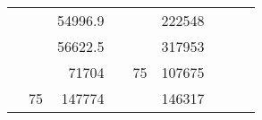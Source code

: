 \begin{table}[H]
\begin{tabular}{|ccrccrccc}
\multicolumn{1}{|c|}{\cellcolor[HTML]{FFFFC7}}                                & \multicolumn{1}{c|}{\cellcolor[HTML]{DAE8FC}}                      & \multicolumn{1}{r|}{\cellcolor[HTML]{DAE8FC}54996.9}   & \multicolumn{1}{c|}{\cellcolor[HTML]{FFFFC7}}                                & \multicolumn{1}{c|}{\cellcolor[HTML]{DAE8FC}}                       & \multicolumn{1}{r|}{\cellcolor[HTML]{DDFDFF}222548}    &                                                                              &                                                                    &                                                        \\ \cline{3-3} \cline{6-6}
\multicolumn{1}{|c|}{\cellcolor[HTML]{FFFFC7}}                                & \multicolumn{1}{c|}{\cellcolor[HTML]{DAE8FC}}                      & \multicolumn{1}{r|}{\cellcolor[HTML]{DDFDFF}56622.5}   & \multicolumn{1}{c|}{\cellcolor[HTML]{FFFFC7}}                                & \multicolumn{1}{c|}{\cellcolor[HTML]{DAE8FC}}                       & \multicolumn{1}{r|}{\cellcolor[HTML]{DAE8FC}317953}    &                                                                              &                                                                    &                                                        \\ \cline{3-3} \cline{6-6}
\multicolumn{1}{|c|}{\cellcolor[HTML]{FFFFC7}}                                & \multicolumn{1}{c|}{\cellcolor[HTML]{DAE8FC}}                      & \multicolumn{1}{r|}{\cellcolor[HTML]{DAE8FC}71704}     & \multicolumn{1}{c|}{\cellcolor[HTML]{FFFFC7}}                                & \multicolumn{1}{c|}{\multirow{-10}{*}{\cellcolor[HTML]{DAE8FC}75}}  & \multicolumn{1}{r|}{\cellcolor[HTML]{DDFDFF}107675}    &                                                                              &                                                                    &                                                        \\ \cline{3-3} \cline{5-6}
\multicolumn{1}{|c|}{\cellcolor[HTML]{FFFFC7}}                                & \multicolumn{1}{c|}{\multirow{-10}{*}{\cellcolor[HTML]{DAE8FC}75}} & \multicolumn{1}{r|}{\cellcolor[HTML]{DDFDFF}147774}    & \multicolumn{1}{c|}{\cellcolor[HTML]{FFFFC7}}                                & \multicolumn{1}{c|}{\cellcolor[HTML]{DDFDFF}}                       & \multicolumn{1}{r|}{\cellcolor[HTML]{DAE8FC}146317}    &                                                                              &                                                                    &                                                        \\ \cline{2-3} \cline{6-6}

\end{tabular}
\end{table}
